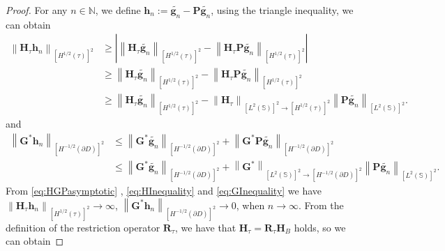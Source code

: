 \documentclass[11pt,reqno,twoside]{amsart}
\theoremstyle{definition}
\theoremstyle{remark}
\numberwithin{equation}{section}
\begin{document}
\begin{proof}
For any $n\in \mathbb N$, we define $\mathbf h_n:= \tilde{\mathbf g_n} - \mathbf P \tilde{\mathbf g_n}$, using the triangle inequality, we can obtain
\begin{equation}\begin{aligned}\label{eq:HInequality}
	    \left\| \mathbf H_{\tau} \mathbf h_n \right\|_{\left[H^{1/2}\left(\tau \right) \right]^2 }
		&\geq \left| \left\| \mathbf H_{\tau} \tilde{\mathbf g_n} \right\|_{\left[H^{1/2}\left(\tau \right) \right]^2 } - \left\| \mathbf H_{\tau} \mathbf P \tilde{\mathbf g_n} \right\|_{\left[H^{1/2}\left(\tau \right) \right]^2 } \right |\\
		&\geq \left\| \mathbf H_{\tau} \tilde{\mathbf g_n} \right\|_{\left[H^{1/2}\left(\tau \right) \right]^2 } - \left\| \mathbf H_{\tau} \mathbf P \tilde{\mathbf g_n} \right\|_{\left[H^{1/2}\left(\tau \right) \right]^2 }\\
		&\geq \left\| \mathbf H_{\tau} \tilde{\mathbf g_n} \right\|_{\left[H^{1/2}\left(\tau \right) \right]^2 } - \left\| \mathbf H_{\tau} \right\|_{ \left[L^{2}\left(\mathbb S \right) \right]^2 \to \left[H^{1/2} \left(\tau \right) \right] ^2 } \left\|\mathbf P \tilde{\mathbf g_n} \right\|_{\left[L^{2} \left(\mathbb S \right) \right] ^2}.
\end{aligned}\end{equation}
and
\begin{equation}\begin{aligned}\label{eq:GInequality}
		\left\| \mathbf G^* \mathbf h_n \right\|_{\left[H^{-1/2}\left(\partial D \right) \right]^2 }
		&\leq \left\| \mathbf G^* \tilde{\mathbf g_n }\right\|_{\left[H^{-1/2}\left(\partial D \right) \right]^2 }+ \left\| \mathbf G^* \mathbf P \tilde{\mathbf g_n }\right\|_{\left[H^{-1/2}\left(\partial D \right) \right]^2 } \\
		&\leq \left\| \mathbf G^* \tilde{\mathbf g_n }\right\|_{\left[H^{-1/2}\left(\partial D \right) \right]^2 }+ \left\| \mathbf G^*\right\|_{\left[L^{2} \left(\mathbb S \right) \right] ^2 \to \left[H^{-1/2}\left(\partial D \right) \right]^2} \left\|\mathbf P \tilde{\mathbf g_n }\right\|_{\left[L^{2} \left(\mathbb S \right) \right] ^2}.
\end{aligned}\end{equation}
From \eqref{eq:HGPasymptotic} , \eqref{eq:HInequality} and  \eqref{eq:GInequality} we have $ \left\| \mathbf H_{\tau} \mathbf h_n \right\|_{\left[H^{1/2}\left(\tau \right) \right]^2 } \to \infty $, $\left\| \mathbf G^* \mathbf h_n \right\|_{\left[H^{-1/2}\left(\partial D \right) \right]^2 } \to 0$, when $n \to \infty$. From the definition of the restriction operator $\mathbf R_{\tau}$, we have that $\mathbf H_{\tau}= \mathbf R_{\tau} \mathbf H_{B} $ holds, so we can obtain

\end{proof}
\end{document}
